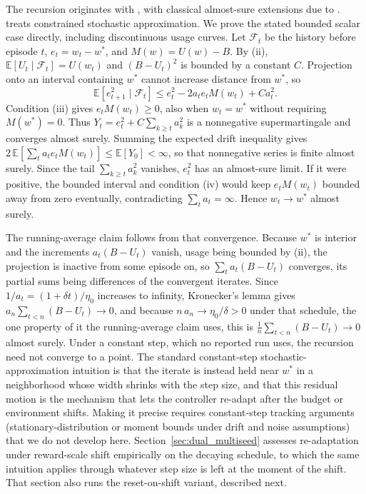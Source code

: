 The recursion originates with \citet{robbins1951}, with classical almost-sure extensions due to \citet{blum1954}. \citet{kushner1978} treats constrained stochastic approximation. We prove the stated bounded scalar case directly, including discontinuous usage curves. Let $\mathcal{F}_t$ be the history before episode $t$, $e_t=w_t-w^*$, and $M(w)=U(w)-B$. By (ii), $\mathbb{E}[U_t\mid\mathcal{F}_t]=U(w_t)$ and $(B-U_t)^2$ is bounded by a constant $C$. Projection onto an interval containing $w^*$ cannot increase distance from $w^*$, so
\[
\mathbb{E}[e_{t+1}^2\mid\mathcal{F}_t]
\le e_t^2-2a_t e_t M(w_t)+C a_t^2.
\]
Condition (iii) gives $e_t M(w_t)\ge0$, also when $w_t=w^*$ without requiring $M(w^*)=0$. Thus $Y_t=e_t^2+C\sum_{k\ge t}a_k^2$ is a nonnegative supermartingale and converges almost surely. Summing the expected drift inequality gives $2\,\mathbb{E}[\sum_t a_t e_t M(w_t)]\le\mathbb{E}[Y_0]<\infty$, so that nonnegative series is finite almost surely. Since the tail $\sum_{k\ge t}a_k^2$ vanishes, $e_t^2$ has an almost-sure limit. If it were positive, the bounded interval and condition (iv) would keep $e_t M(w_t)$ bounded away from zero eventually, contradicting $\sum_t a_t=\infty$. Hence $w_t\to w^*$ almost surely.

The running-average claim follows from that convergence. Because $w^*$ is interior and the increments $a_t (B - U_t)$ vanish, usage being bounded by (ii), the projection is inactive from some episode on, so $\sum_t a_t (B - U_t)$ converges, its partial sums being differences of the convergent iterates. Since $1/a_t = (1 + \delta t)/\eta_0$ increases to infinity, Kronecker's lemma gives $a_n \sum_{t<n} (B - U_t) \to 0$, and because $n\,a_n \to \eta_0/\delta > 0$ under that schedule, the one property of it the running-average claim uses, this is $\frac{1}{n}\sum_{t<n} (B - U_t) \to 0$ almost surely. Under a constant step, which no reported run uses, the recursion need not converge to a point. The standard constant-step stochastic-approximation intuition is that the iterate is instead held near $w^*$ in a neighborhood whose width shrinks with the step size, and that this residual motion is the mechanism that lets the controller re-adapt after the budget or environment shifts. Making it precise requires constant-step tracking arguments (stationary-distribution or moment bounds under drift and noise assumptions) that we do not develop here. Section~\ref{sec:dual_multiseed} assesses re-adaptation under reward-scale shift empirically on the decaying schedule, to which the same intuition applies through whatever step size is left at the moment of the shift. That section also runs the reset-on-shift variant, described next.

